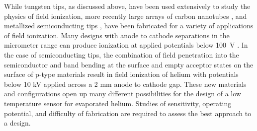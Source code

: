 \documentclass[10pt, letterpaper, reprint, superscriptaddress, aps, prl]
{revtex4-1} \usepackage[latin1]{inputenc}
\begin{document}
While tungsten tips, as discussed above, have been used extensively to study the physics of field ionization, more recently large arrays of carbon nanotubes \cite{Modi2003}, and metallized semiconducting tips \cite{Gesemann2011,Liu2013,Spitsina2016}, have been fabricated for a variety of applications of field ionization. 
Many designs with anode to cathode separations in the micrometer range can produce ionization at applied potentials below 100~V \cite{Mohammadpour2014}. 
In the case of semiconducting tips, the combination of field penetration into the semiconductor \cite{Ohno1978,Tsong1979} and band bending at the surface and empty acceptor states on the surface of p-type materials \cite{Tsong1979} result in field ionization of helium with potentials below 10 kV applied across a 2 mm anode to cathode gap. 
These new materials and configurations open up many different possibilities for the design of a low temperature sensor for evaporated helium. 
Studies of sensitivity, operating potential, and difficulty of fabrication are required to assess the best approach to a design.

\end{document}
